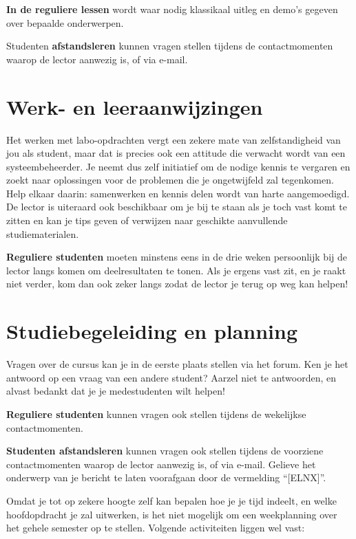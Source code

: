 \textbf{In de reguliere lessen} wordt waar nodig klassikaal uitleg en demo's gegeven over bepaalde onderwerpen.

Studenten \textbf{afstandsleren} kunnen vragen stellen tijdens de contactmomenten waarop de lector aanwezig is, of via e-mail.

\section{Werk- en leeraanwijzingen}
\label{sec:werk-en-leeraanwijzingen}

Het werken met labo-opdrachten vergt een zekere mate van zelfstandigheid van jou als student, maar dat is precies ook een attitude die verwacht wordt van een systeembeheerder. Je neemt dus zelf initiatief om de nodige kennis te vergaren en zoekt naar oplossingen voor de problemen die je ongetwijfeld zal tegenkomen. Help elkaar daarin: samenwerken en kennis delen wordt van harte aangemoedigd. De lector is uiteraard ook beschikbaar om je bij te staan als je toch vast komt te zitten en kan je tips geven of verwijzen naar geschikte aanvullende studiematerialen.

\textbf{Reguliere studenten} moeten minstens eens in de drie weken persoonlijk bij de lector langs komen om deelresultaten te tonen. Als je ergens vast zit, en je raakt niet verder, kom dan ook zeker langs zodat de lector je terug op weg kan helpen!

\section{Studiebegeleiding en planning}
\label{sec:studiebegeleiding-en-planning}

Vragen over de cursus kan je in de eerste plaats stellen via het forum. Ken je het antwoord op een vraag van een andere student? Aarzel niet te antwoorden, en alvast bedankt dat je je medestudenten wilt helpen!

\textbf{Reguliere studenten} kunnen vragen ook stellen tijdens de wekelijkse contactmomenten.

\textbf{Studenten afstandsleren} kunnen vragen ook stellen tijdens de voorziene contactmomenten waarop de lector aanwezig is, of via e-mail. Gelieve het onderwerp van je bericht te laten voorafgaan door de vermelding ``[ELNX]''.


Omdat je tot op zekere hoogte zelf kan bepalen hoe je je tijd indeelt, en welke hoofdopdracht je zal uitwerken, is het niet mogelijk om een weekplanning over het gehele semester op te stellen. Volgende activiteiten liggen wel vast:

